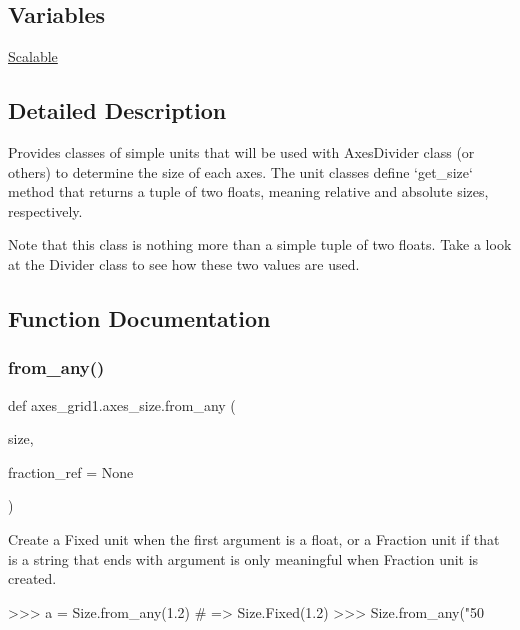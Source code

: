 \subsection*{Variables}
\begin{DoxyCompactItemize}
\item 
\hyperlink{namespaceaxes__grid1_1_1axes__size_a4c4ec66c392071f82191f415efa67456}{Scalable}
\end{DoxyCompactItemize}


\subsection{Detailed Description}
\begin{DoxyVerb}Provides classes of simple units that will be used with AxesDivider
class (or others) to determine the size of each axes. The unit
classes define `get_size` method that returns a tuple of two floats,
meaning relative and absolute sizes, respectively.

Note that this class is nothing more than a simple tuple of two
floats. Take a look at the Divider class to see how these two
values are used.
\end{DoxyVerb}
 

\subsection{Function Documentation}
\mbox{\label{namespaceaxes__grid1_1_1axes__size_a30da3c4637b026d06d84e968b787fe89}} 
\subsubsection{\texorpdfstring{from\+\_\+any()}{from\_any()}}
{\footnotesize\ttfamily def axes\+\_\+grid1.\+axes\+\_\+size.\+from\+\_\+any (\begin{DoxyParamCaption}\item[{}]{size,  }\item[{}]{fraction\+\_\+ref = {\ttfamily None} }\end{DoxyParamCaption})}

\begin{DoxyVerb}Create a Fixed unit when the first argument is a float, or a
Fraction unit if that is a string that ends with %
argument is only meaningful when Fraction unit is created.

>>> a = Size.from_any(1.2) # => Size.Fixed(1.2)
>>> Size.from_any("50%
\end{DoxyVerb}
 

